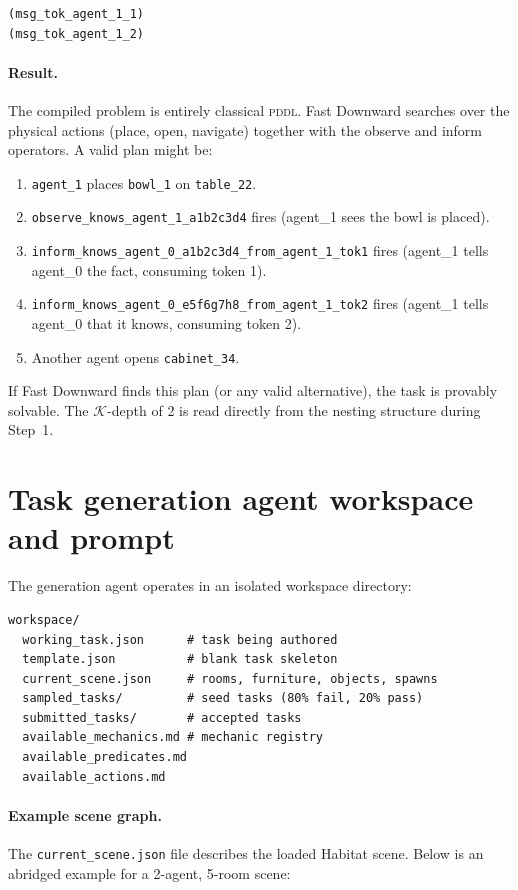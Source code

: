 \documentclass{article} %
\newcommand{\K}{\mathcal{K}}
\newcommand{\pddl}{\textsc{pddl}}
\begin{document}
\begin{lstlisting}
(msg_tok_agent_1_1)
(msg_tok_agent_1_2)
\end{lstlisting}

\paragraph{Result.} The compiled problem is entirely classical \pddl{}. Fast Downward searches over the physical actions (place, open, navigate) together with the observe and inform operators. A valid plan might be:

\begin{enumerate}
  \item \texttt{agent\_1} places \texttt{bowl\_1} on \texttt{table\_22}.
  \item \texttt{observe\_knows\_agent\_1\_a1b2c3d4} fires (agent\_1 sees the bowl is placed).
  \item \texttt{inform\_knows\_agent\_0\_a1b2c3d4\_from\_agent\_1\_tok1} fires (agent\_1 tells agent\_0 the fact, consuming token 1).
  \item \texttt{inform\_knows\_agent\_0\_e5f6g7h8\_from\_agent\_1\_tok2} fires (agent\_1 tells agent\_0 that it knows, consuming token 2).
  \item Another agent opens \texttt{cabinet\_34}.
\end{enumerate}

If Fast Downward finds this plan (or any valid alternative), the task is provably solvable. The $\K$-depth of 2 is read directly from the nesting structure during Step~1.

\section{Task generation agent workspace and prompt}
\label{app:workspace}

The generation agent operates in an isolated workspace directory:
\begin{lstlisting}
workspace/
  working_task.json      # task being authored
  template.json          # blank task skeleton
  current_scene.json     # rooms, furniture, objects, spawns
  sampled_tasks/         # seed tasks (80% fail, 20% pass)
  submitted_tasks/       # accepted tasks
  available_mechanics.md # mechanic registry
  available_predicates.md
  available_actions.md
\end{lstlisting}

\paragraph{Example scene graph.} The \texttt{current\_scene.json} file describes the loaded Habitat scene. Below is an abridged example for a 2-agent, 5-room scene:
\end{document}
